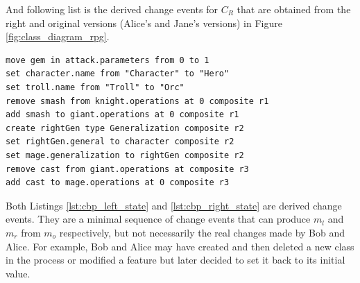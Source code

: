 And following list is the derived change events for $C_{R}$ that are obtained from the right and original versions (Alice's and Jane's versions) in Figure \ref{fig:class_diagram_rpg}. 
\begin{lstlisting}[firstnumber=1,style=eol,caption={The derived, minimal change events to produce the right version (Alice's version) in Figure \ref{fig:class_diagram_right} from the original version (Jane's version).},label=lst:cbp_right_state]
move gem in attack.parameters from 0 to 1
set character.name from "Character" to "Hero"
set troll.name from "Troll" to "Orc"
remove smash from knight.operations at 0 composite r1
add smash to giant.operations at 0 composite r1
create rightGen type Generalization composite r2
set rightGen.general to character composite r2
set mage.generalization to rightGen composite r2
remove cast from giant.operations at composite r3
add cast to mage.operations at 0 composite r3
\end{lstlisting}

Both Listings \ref{lst:cbp_left_state} and \ref{lst:cbp_right_state} are derived change events. They are a minimal sequence of change events that can produce $m_{l}$ and $m_{r}$ from $m_{o}$ respectively, but not necessarily the real changes made by Bob and Alice. For example, Bob and Alice may have created and then deleted a new class in the process or modified a feature but later decided to set it back to its initial value.

